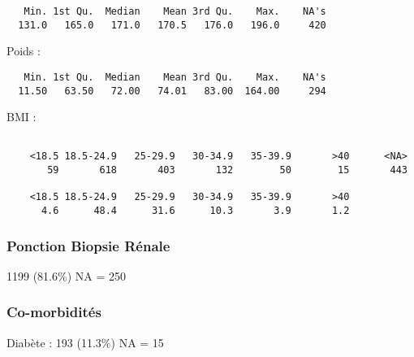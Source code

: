 \documentclass[11pt,a4paper]{article}\usepackage[]{graphicx}\usepackage[]{color}
\makeatletter
\newenvironment{kframe}{%
 \def\at@end@of@kframe{}%
 \ifinner\ifhmode%
  \def\at@end@of@kframe{\end{minipage}}%
  \begin{minipage}{\columnwidth}%
 \fi\fi%
 \def\FrameCommand##1{\hskip\@totalleftmargin \hskip-\fboxsep
 \colorbox{shadecolor}{##1}\hskip-\fboxsep
     \hskip-\linewidth \hskip-\@totalleftmargin \hskip\columnwidth}%
 \MakeFramed {\advance\hsize-\width
   \@totalleftmargin\z@ \linewidth\hsize
   \@setminipage}}%
 {\par\unskip\endMakeFramed%
 \at@end@of@kframe}
\newenvironment{knitrout}{}{} %
\makeatother
\begin{document}
\begin{knitrout}
\color{fgcolor}\begin{kframe}
\begin{verbatim}
   Min. 1st Qu.  Median    Mean 3rd Qu.    Max.    NA's 
  131.0   165.0   171.0   170.5   176.0   196.0     420 
\end{verbatim}
\end{kframe}
\end{knitrout}

Poids :

\begin{knitrout}
\color{fgcolor}\begin{kframe}
\begin{verbatim}
   Min. 1st Qu.  Median    Mean 3rd Qu.    Max.    NA's 
  11.50   63.50   72.00   74.01   83.00  164.00     294 
\end{verbatim}
\end{kframe}
\end{knitrout}

BMI :

\begin{knitrout}
\color{fgcolor}\begin{kframe}
\begin{verbatim}

    <18.5 18.5-24.9   25-29.9   30-34.9   35-39.9       >40      <NA> 
       59       618       403       132        50        15       443 

    <18.5 18.5-24.9   25-29.9   30-34.9   35-39.9       >40 
      4.6      48.4      31.6      10.3       3.9       1.2 
\end{verbatim}
\end{kframe}
\end{knitrout}

      \subsubsection{Ponction Biopsie Rénale}

1199 (81.6\%) NA = 250

      \subsubsection{Co-morbidités}



Diabète : 193 (11.3\%) NA = 15
\end{document}
